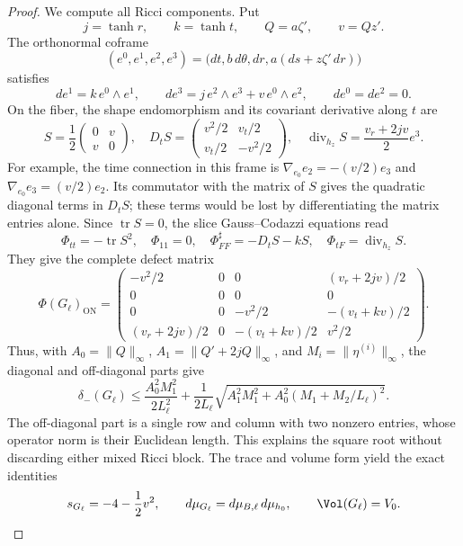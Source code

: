 \begin{proof}
We compute all Ricci components.  Put
\[
 j=\tanh r,\qquad k=\tanh t,\qquad
 Q=a\zeta',\qquad v=Qz'.
\]
The orthonormal coframe
\[
 (e^0,e^1,e^2,e^3)
   =\bigl(dt,b\,d\theta,dr,a(ds+z\zeta'\,dr)\bigr)
\]
satisfies
\begin{equation}\label{eq:fixed-bundle-structure}
 de^1=k\,e^0\wedge e^1,\qquad
 de^3=j\,e^2\wedge e^3+v\,e^0\wedge e^2,\qquad
 de^0=de^2=0.
\end{equation}
On the fiber, the shape endomorphism and its covariant derivative
along $t$ are
\begin{equation}\label{eq:fixed-bundle-shape}
 S=\frac12\begin{pmatrix}0&v\\v&0\end{pmatrix},
 \quad D_tS=\begin{pmatrix}v^2/2&v_t/2\\v_t/2&-v^2/2\end{pmatrix},
 \quad \operatorname{div}_{h_z}S=\frac{v_r+2jv}{2}e^3.
\end{equation}
For example, the time connection in this frame is
$\nabla_{e_0}e_2=-(v/2)e_3$ and
$\nabla_{e_0}e_3=(v/2)e_2$.  Its commutator with the matrix of
$S$ gives the quadratic diagonal terms in $D_tS$; these terms
would be lost by differentiating the matrix entries alone.
Since $\operatorname{tr}S=0$, the slice Gauss--Codazzi equations read
\[
 \Phi_{tt}=-\operatorname{tr}S^2,\quad
 \Phi_{11}=0,\quad
 \Phi_{FF}^{\sharp}=-D_tS-kS,\quad
 \Phi_{tF}=\operatorname{div}_{h_z}S.
\]
They give the complete defect matrix
\begin{equation}\label{eq:fixed-bundle-ricci-matrix}
 \Phi(G_\ell)_{\mathrm{ON}}=
 \begin{pmatrix}
 -v^2/2&0&0&(v_r+2jv)/2\\
 0&0&0&0\\
 0&0&-v^2/2&-(v_t+kv)/2\\
 (v_r+2jv)/2&0&-(v_t+kv)/2&v^2/2
 \end{pmatrix}.
\end{equation}
Thus, with
$A_0=\|Q\|_\infty$, $A_1=\|Q'+2jQ\|_\infty$, and
$M_i=\|\eta^{(i)}\|_\infty$, the diagonal and off-diagonal parts give
\begin{equation}\label{eq:fixed-bundle-explicit-bound}
 \delta_-(G_\ell)
 \le\frac{A_0^2M_1^2}{2L_\ell^2}
 +\frac1{2L_\ell}
   \sqrt{A_1^2M_1^2+A_0^2(M_1+M_2/L_\ell)^2}.
\end{equation}
The off-diagonal part is a single row and column with two nonzero
entries, whose operator norm is their Euclidean length.  This
explains the square root without discarding either mixed Ricci block.
The trace and volume form yield the exact identities
\begin{equation}\label{eq:fixed-bundle-scalar-volume}
 s_{G_\ell}=-4-\frac12v^2,\qquad
 d\mu_{G_\ell}=d\mu_{B,\ell}\,d\mu_{h_0},\qquad
 \Vol(G_\ell)=V_0.
\end{equation}


\end{proof}
